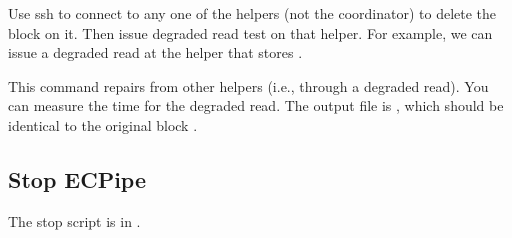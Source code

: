 \documentclass[letterpaper,12pt]{article}
\begin{document}
Use ssh to connect to any one of the helpers (not the coordinator) to delete the block on it.
Then issue degraded read test on that helper.
For example, we can issue a degraded read at the helper that stores
.

\begin{center}
\noindent{}
\end{center}

This command repairs  from other helpers (i.e., through a degraded
read).  You can measure the time for the degraded read.  The output file is
, which should be identical to the original block
.

\subsection{Stop ECPipe}

The stop script is in .

\begin{center}
\noindent{}
\end{center}
\end{document}
